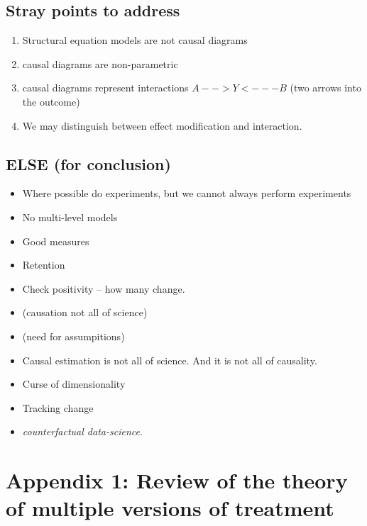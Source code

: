 \documentclass[
  singlecolumn]{report}
\providecommand{\tightlist}{%
  \setlength{\itemsep}{0pt}\setlength{\parskip}{0pt}}\usepackage{longtable,booktabs,array}
\begin{document}
\hypertarget{stray-points-to-address}{%
\subsection{Stray points to address}\label{stray-points-to-address}}

\begin{enumerate}
\def\labelenumi{\arabic{enumi}.}
\tightlist
\item
  Structural equation models are not causal diagrams
\item
  causal diagrams are non-parametric
\item
  causal diagrams represent interactions \(A -- > Y <--- B\) (two arrows
  into the outcome)
\item
  We may distinguish between effect modification and interaction.
\end{enumerate}

\hypertarget{else-for-conclusion}{%
\subsection{ELSE (for conclusion)}\label{else-for-conclusion}}

\begin{itemize}
\tightlist
\item
  Where possible do experiments, but we cannot always perform
  experiments\\
\item
  No multi-level models
\item
  Good measures
\item
  Retention
\item
  Check positivity -- how many change.
\item
  (causation not all of science)
\item
  (need for assumpitions)
\item
  Causal estimation is not all of science. And it is not all of
  causality.
\item
  Curse of dimensionality
\item
  Tracking change
\item
  \emph{counterfactual data-science}.
\end{itemize}

\hypertarget{appendix-1-review-of-the-theory-of-multiple-versions-of-treatment}{%
\section{Appendix 1: Review of the theory of multiple versions of
treatment}\label{appendix-1-review-of-the-theory-of-multiple-versions-of-treatment}}
\end{document}
